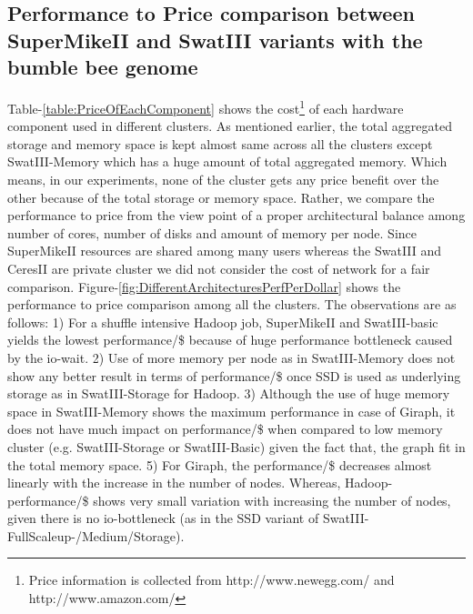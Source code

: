\documentclass[conference]{IEEEtran}
\begin{document}
\subsection {Performance to Price comparison between SuperMikeII and SwatIII variants with the bumble bee genome} \label{PriceToPerformance}
Table-\ref{table:PriceOfEachComponent} shows the cost\footnote{Price information is collected from http://www.newegg.com/ and http://www.amazon.com/} of each hardware component used in different clusters.
As mentioned earlier, the total aggregated storage and memory space is kept almost same across all the clusters except SwatIII-Memory which has a huge amount of total aggregated memory.
Which means, in our experiments, none of the cluster gets any price benefit over the other because of the total storage or memory space.   
Rather, we compare the performance to price from the view point of a proper architectural balance among number of cores, number of disks and amount of memory per node.
Since SuperMikeII resources are shared among many users whereas the SwatIII and CeresII are private cluster we did not consider the cost of network for a fair comparison.
Figure-\ref{fig:DifferentArchitecturesPerfPerDollar} shows the performance to price comparison among all the clusters.
The observations are as follows:
1) For a shuffle intensive Hadoop job, SuperMikeII and SwatIII-basic yields the lowest performance/\$ because of huge performance bottleneck caused by the io-wait.
2) Use of more memory per node as in SwatIII-Memory does not show any better result in terms of performance/\$ once SSD is used as underlying storage as in SwatIII-Storage for Hadoop.
3) Although the use of huge memory space in SwatIII-Memory shows the maximum performance in case of Giraph, it does not have much impact on performance/\$ when compared to low memory cluster (e.g. SwatIII-Storage or SwatIII-Basic) given the fact that, the graph fit in the total memory space.
5) For Giraph, the performance/\$ decreases almost linearly with the increase in the number of nodes. Whereas, Hadoop-performance/\$ shows very small variation with increasing the number of nodes, given there is no io-bottleneck (as in the SSD variant of SwatIII-FullScaleup-/Medium/Storage). 
\end{document}
